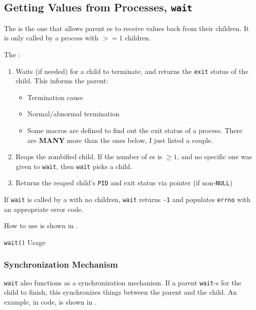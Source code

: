 \subsection{Getting Values from Processes, \texttt{wait}}\label{subsec:Values_from_Processes-wait}
The   is the one that allows parent es to receive values back from their children.
It is only called by a process with $>= 1$ children.

The  :
\begin{enumerate}[noitemsep]
\item Waits (if needed) for a child to terminate, and returns the \texttt{exit} status of the child.
  This informs the parent:
  \begin{itemize}[noitemsep]
  \item Termination cause
  \item Normal/abnormal termination
  \item Some macros are defined to find out the exit status of a process.
    There are \textbf{MANY} more than the ones below, I just listed a couple.
  \end{itemize}

\item Reaps the zombified child.
  If the number of es is $\geq 1$, and no specific one was given to \texttt{wait}, then \texttt{wait} picks a child.
\item Returns the reaped child's \texttt{PID} and exit status via pointer (if non-\texttt{NULL})
\end{enumerate}

If \texttt{wait} is called by a  with no children, \texttt{wait} returns \texttt{-1} and populates \texttt{errno} with an appropriate error code.

How to use  is shown in .

\begin{listing}[h!tbp]
\caption{\texttt{wait()} Usage}
\label{lst:wait_Usage}
\end{listing}

\subsubsection{Synchronization Mechanism}\label{subsubsec:wait-Synchronization_Mechanism}
\texttt{wait} also functions as a synchronization mechanism.
If a parent  \texttt{wait}-s for the child to finish, this synchronizes things between the parent and the child.
An example, in code, is shown in .


